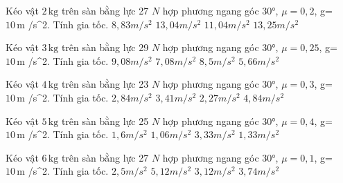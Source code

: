\begin{ex}
Kéo vật $2\,\text{kg}$ trên sàn bằng lực 27 $N$ hợp phương ngang góc 30°, $\mu=0,2$, g= $10\,\text{m}$ /s^2. Tính gia tốc.
\choice
{$8,83 m/s^2$}
{$13,04 m/s^2$}
{\True $11,04 m/s^2$}
{$13,25 m/s^2$}
\end{ex}

\begin{ex}
Kéo vật $3\,\text{kg}$ trên sàn bằng lực 29 $N$ hợp phương ngang góc 30°, $\mu=0,25$, g= $10\,\text{m}$ /s^2. Tính gia tốc.
\choice
{$9,08 m/s^2$}
{\True $7,08 m/s^2$}
{$8,5 m/s^2$}
{$5,66 m/s^2$}
\end{ex}

\begin{ex}
Kéo vật $4\,\text{kg}$ trên sàn bằng lực 23 $N$ hợp phương ngang góc 30°, $\mu=0,3$, g= $10\,\text{m}$ /s^2. Tính gia tốc.
\choice
{\True $2,84 m/s^2$}
{$3,41 m/s^2$}
{$2,27 m/s^2$}
{$4,84 m/s^2$}
\end{ex}

\begin{ex}
Kéo vật $5\,\text{kg}$ trên sàn bằng lực 25 $N$ hợp phương ngang góc 30°, $\mu=0,4$, g= $10\,\text{m}$ /s^2. Tính gia tốc.
\choice
{$1,6 m/s^2$}
{$1,06 m/s^2$}
{$3,33 m/s^2$}
{\True $1,33 m/s^2$}
\end{ex}

\begin{ex}
Kéo vật $6\,\text{kg}$ trên sàn bằng lực 27 $N$ hợp phương ngang góc 30°, $\mu=0,1$, g= $10\,\text{m}$ /s^2. Tính gia tốc.
\choice
{$2,5 m/s^2$}
{$5,12 m/s^2$}
{\True $3,12 m/s^2$}
{$3,74 m/s^2$}
\end{ex}


